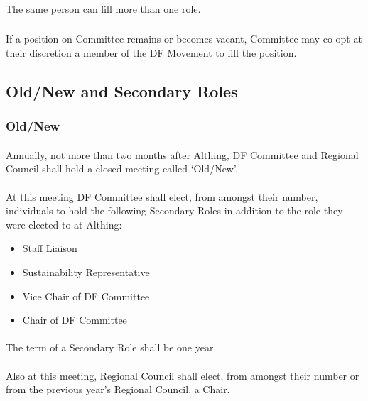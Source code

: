 \documentclass[a4paper, 12pt]{report}
\begin{document}
\subsubsection{}
\label{sec:moreroles}
The same person can fill more than one role.

\subsubsection{}
If a position on Committee remains or becomes vacant, Committee may co-opt at their discretion a member of the DF Movement to fill the position.

\subsection{Old/New and Secondary Roles}
\label{sec:secondaryroles}
\subsubsection{Old/New}
\label{sec:oldnew}
\paragraph{} Annually, not more than two months after Althing, DF Committee and Regional Council shall hold a closed meeting called `Old/New'.
\paragraph{} At this meeting DF Committee shall elect, from amongst their number, individuals to hold the following Secondary Roles in addition to the role they were elected to at Althing:
\begin{itemize}
\item Staff Liaison
\item Sustainability Representative
\item Vice Chair of DF Committee
\item Chair of DF Committee
\end{itemize}

\paragraph{} The term of a Secondary Role shall be one year.

\paragraph{} \label{par:rcchair} Also at this meeting, Regional Council shall elect, from amongst their number or from the previous year's Regional Council, a Chair.
\end{document}
